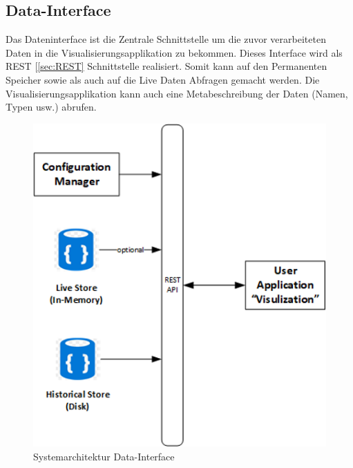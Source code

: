 \subsection{Data-Interface}
Das Dateninterface ist die Zentrale Schnittstelle um die zuvor verarbeiteten Daten in die Visualisierungsapplikation zu bekommen.
Dieses Interface wird als REST [\ref{sec:REST} Schnittstelle realisiert. Somit kann auf den Permanenten Speicher sowie als auch auf die Live Daten Abfragen gemacht werden. Die Visualisierungsapplikation kann auch eine Metabeschreibung der Daten (Namen, Typen usw.) abrufen.
\begin{figure}[H]
    \centering
    \includegraphics[scale=1]{images/archDataInterface.png}
    \caption{Systemarchitektur Data-Interface}
    \label{img:archDataInterface}
\end{figure}